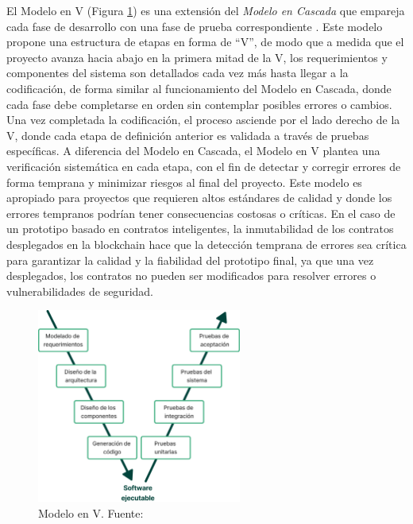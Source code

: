 El Modelo en V (Figura \ref{fig:model-v}) es una extensión del \textit{Modelo en Cascada} que empareja cada fase de desarrollo con una fase de prueba correspondiente \cite{pressman2010ingenieria}. Este modelo propone una estructura de etapas en forma de ``V'', de modo que a medida que el proyecto avanza hacia abajo en la primera mitad de la V, los requerimientos y componentes del sistema son detallados cada vez más hasta llegar a la codificación, de forma similar al funcionamiento del Modelo en Cascada, donde cada fase debe completarse en orden sin contemplar posibles errores o cambios. Una vez completada la codificación, el proceso asciende por el lado derecho de la V, donde cada etapa de definición anterior es validada a través de pruebas específicas. A diferencia del Modelo en Cascada, el Modelo en V plantea una verificación sistemática en cada etapa, con el fin de detectar y corregir errores de forma temprana y minimizar riesgos al final del proyecto. Este modelo es apropiado para proyectos que requieren altos estándares de calidad y donde los errores tempranos podrían tener consecuencias costosas o críticas. En el caso de un prototipo basado en contratos inteligentes, la inmutabilidad de los contratos desplegados en la blockchain hace que la detección temprana de errores sea crítica para garantizar la calidad y la fiabilidad del prototipo final, ya que una vez desplegados, los contratos no pueden ser modificados para resolver errores o vulnerabilidades de seguridad.

\begin{figure}[!tb]
	\centering
	\includegraphics[width=0.6\textwidth]{Figures/model-v.png}
	\caption[Modelo en V]{Modelo en V. Fuente: \cite{pressman2010ingenieria}}
    \label{fig:model-v}
\end{figure}

